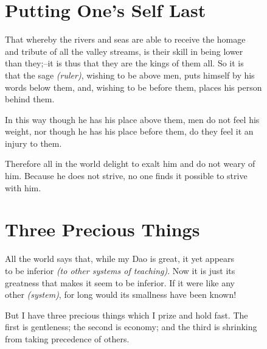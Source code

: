\section*{Putting One's Self Last}
    That whereby the rivers and seas are able to receive the homage\\
    and tribute of all the valley streams, is their skill in being lower\\
    than they;--it is thus that they are the kings of them all. So it is\\
    that the sage \textit{(ruler)}, wishing to be above men, puts himself by his\\
    words below them, and, wishing to be before them, places his person\\
    behind them.\vspace{\baselineskip}
    
    In this way though he has his place above them, men do not feel his\\
    weight, nor though he has his place before them, do they feel it an\\
    injury to them.\vspace{\baselineskip}
    
    Therefore all in the world delight to exalt him and do not weary of\\
    him. Because he does not strive, no one finds it possible to strive\\
    with him.\vspace{\baselineskip}
    
\section*{Three Precious Things}
    All the world says that, while my Dao is great, it yet appears\\
    to be inferior \textit{(to other systems of teaching)}. Now it is just its\\
    greatness that makes it seem to be inferior. If it were like any\\
    other \textit{(system)}, for long would its smallness have been known!\vspace{\baselineskip}\newpage{}
    
    But I have three precious things which I prize and hold fast. The\\
    first is gentleness; the second is economy; and the third is shrinking\\
    from taking precedence of others.\vspace{\baselineskip}
    
